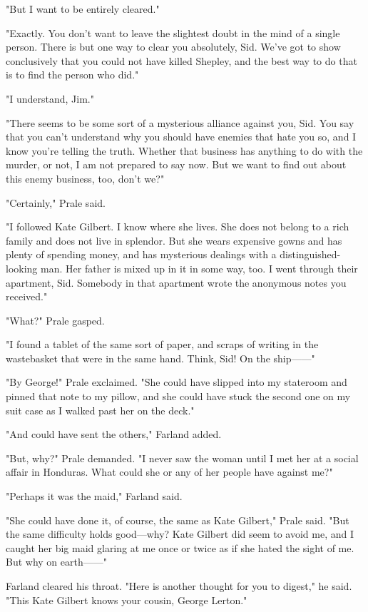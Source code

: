 \documentclass{novel}
\begin{document}
"But I want to be entirely cleared."

"Exactly. You don't want to leave the slightest doubt in the mind of a single person. There is but one way to clear you absolutely, Sid. We've got to show conclusively that you could not have killed Shepley, and the best way to do that is to find the person who did."

"I understand, Jim."

"There seems to be some sort of a mysterious alliance against you, Sid. You say that you can't understand why you should have enemies that hate you so, and I know you're telling the truth. Whether that business has anything to do with the murder, or not, I am not prepared to say now. But we want to find out about this enemy business, too, don't we?"

"Certainly," Prale said.

"I followed Kate Gilbert. I know where she lives. She does not belong to a rich family and does not live in splendor. But she wears expensive gowns and has plenty of spending money, and has mysterious dealings with a distinguished-looking man. Her father is mixed up in it in some way, too. I went through their apartment, Sid. Somebody in that apartment wrote the anonymous notes you received."

"What?" Prale gasped.

"I found a tablet of the same sort of paper, and scraps of writing in the wastebasket that were in the same hand. Think, Sid! On the ship------"

"By George!" Prale exclaimed. "She could have slipped into my stateroom and pinned that note to my pillow, and she could have stuck the second one on my suit case as I walked past her on the deck."

"And could have sent the others," Farland added.

"But, why?" Prale demanded. "I never saw the woman until I met her at a social affair in Honduras. What could she or any of her people have against me?"

"Perhaps it was the maid," Farland said.

"She could have done it, of course, the same as Kate Gilbert," Prale said. "But the same difficulty holds good---why? Kate Gilbert did seem to avoid me, and I caught her big maid glaring at me once or twice as if she hated the sight of me. But why on earth------"

Farland cleared his throat. "Here is another thought for you to digest," he said. "This Kate Gilbert knows your cousin, George Lerton."
\end{document}
